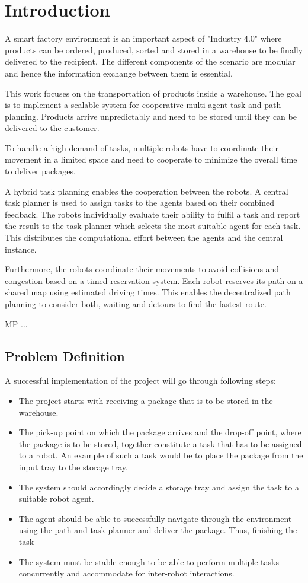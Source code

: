 \documentclass[journal]{IEEEtran}
\begin{document}
\section{Introduction}
\label{sec:introduction}
A smart factory environment is an important aspect of "Industry 4.0" where products can be ordered, produced, sorted and stored in a warehouse to be finally delivered to the recipient. The different components of the scenario are modular and hence the information exchange between them is essential.

This work focuses on the transportation of products inside a warehouse. The goal is to implement a scalable system for cooperative multi-agent task and path planning. Products arrive unpredictably and need to be stored until they can be delivered to the customer.

To handle a high demand of tasks, multiple robots have to coordinate their movement in a limited space and need to cooperate to minimize the overall time to deliver packages.

A hybrid task planning enables the cooperation between the robots. A central task planner is used to assign tasks to the agents based on their combined feedback. The robots individually evaluate their ability to fulfil a task and report the result to the task planner which selects the most suitable agent for each task. This distributes the computational effort between the agents and the central instance.

Furthermore, the robots coordinate their movements to avoid collisions and congestion based on a timed reservation system. Each robot reserves its path on a shared map using estimated driving times. This enables the decentralized path planning to consider both, waiting and detours to find the fastest route.

MP ...

\subsection{Problem Definition}
A successful implementation of the project will go through following steps:
\begin{itemize}
\item The project starts with receiving a package that is to be stored in the warehouse.
\item The pick-up point on which the package arrives and the drop-off point, where the package is to be stored, together constitute a task that has to be assigned to a robot. An example of such a task would be to place the package from the input tray to the storage tray. 
\item The system should accordingly decide a storage tray and assign the task to a suitable robot agent.
\item The agent should be able to successfully navigate through the environment using the path and task planner and deliver the package. Thus, finishing the task
\item The system must be stable enough to be able to perform multiple tasks concurrently and accommodate for inter-robot interactions.  
\end{itemize} 
\end{document}
